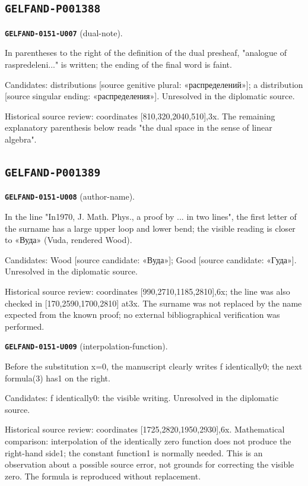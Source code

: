 \subsection*{\texttt{GELFAND-P001388}}
\par\noindent\leavevmode{}\label{GELFAND-0151-U007}\textbf{\texttt{GELFAND-0151-U007}} (dual-note).\nopagebreak[4]\par
In parentheses to the right of the definition of the dual presheaf, "analogue of raspredeleni..." is written; the ending of the final word is faint.\par
Candidates: distributions [source genitive plural: «распределений»]; a distribution [source singular ending: «распределения»]. Unresolved in the diplomatic source.\par
Historical source review: coordinates [810,320,2040,510],3x. The remaining explanatory parenthesis below reads "the dual space in the sense of linear algebra".\par
\medskip
\subsection*{\texttt{GELFAND-P001389}}
\par\noindent\leavevmode{}\label{GELFAND-0151-U008}\textbf{\texttt{GELFAND-0151-U008}} (author-name).\nopagebreak[4]\par
In the line "In1970, J. Math. Phys., a proof by ... in two lines", the first letter of the surname has a large upper loop and lower bend; the visible reading is closer to «Вуда» (Vuda, rendered Wood).\par
Candidates: Wood [source candidate: «Вуда»]; Good [source candidate: «Гуда»]. Unresolved in the diplomatic source.\par
Historical source review: coordinates [990,2710,1185,2810],6x; the line was also checked in [170,2590,1700,2810] at3x. The surname was not replaced by the name expected from the known proof; no external bibliographical verification was performed.\par
\medskip
\par\noindent\leavevmode{}\label{GELFAND-0151-U009}\textbf{\texttt{GELFAND-0151-U009}} (interpolation-function).\nopagebreak[4]\par
Before the substitution x=0, the manuscript clearly writes f identically0; the next formula(3) has1 on the right.\par
Candidates: f identically0: the visible writing. Unresolved in the diplomatic source.\par
Historical source review: coordinates [1725,2820,1950,2930],6x. Mathematical comparison: interpolation of the identically zero function does not produce the right-hand side1; the constant function1 is normally needed. This is an observation about a possible source error, not grounds for correcting the visible zero. The formula is reproduced without replacement.\par
\medskip
